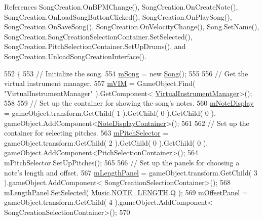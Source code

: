 References Song\+Creation.\+On\+B\+P\+M\+Change(), Song\+Creation.\+On\+Create\+Note(), Song\+Creation.\+On\+Load\+Song\+Button\+Clicked(), Song\+Creation.\+On\+Play\+Song(), Song\+Creation.\+On\+Save\+Song(), Song\+Creation.\+On\+Velocity\+Change(), Song.\+Set\+Name(), Song\+Creation.\+Song\+Creation\+Selection\+Container.\+Set\+Selected(), Song\+Creation.\+Pitch\+Selection\+Container.\+Set\+Up\+Drums(), and Song\+Creation.\+Unload\+Song\+Creation\+Interface().


\begin{DoxyCode}
552     \{
553         \textcolor{comment}{// Initialize the song.}
554         \hyperlink{group___s_c_priv_var_ga9554e9b3758d1cc1e841a5f7d8aa9f56}{mSong} = \textcolor{keyword}{new} \hyperlink{class_song}{Song}();
555 
556         \textcolor{comment}{// Get the virtual instrument manager.}
557         \hyperlink{group___s_c_priv_var_ga1bad472098eec4194c5b18e7b3ccfd94}{mVIM} = GameObject.Find( \textcolor{stringliteral}{"VirtualInstrumentManager"} ).GetComponent<
      \hyperlink{class_virtual_instrument_manager}{VirtualInstrumentManager}>();
558 
559         \textcolor{comment}{// Set up the container for showing the song's notes.}
560         \hyperlink{group___s_c_priv_var_ga19cefeb7077126193c7f60d07dfdf32c}{mNoteDisplay} = gameObject.transform.GetChild( 1 ).GetChild( 0 ).GetChild( 0 ).
      gameObject.AddComponent<\hyperlink{class_note_display_container}{NoteDisplayContainer}>();
561 
562         \textcolor{comment}{// Set up the container for selecting pitches.}
563         \hyperlink{group___s_c_priv_var_gac32e68713b2b504807f52acef445df1c}{mPitchSelector} = gameObject.transform.GetChild( 2 ).GetChild( 0 ).GetChild( 0 ).
      gameObject.AddComponent<PitchSelectionContainer>();
564         mPitchSelector.SetUpPitches();
565 
566         \textcolor{comment}{// Set up the panels for choosing a note's length and offset.}
567         \hyperlink{group___s_c_priv_var_ga370237b50bc11a581fc963cdd8ffd4ea}{mLengthPanel} = gameObject.transform.GetChild( 3 ).gameObject.AddComponent<
      SongCreationSelectionContainer>();
568         \hyperlink{group___s_c_priv_var_ga370237b50bc11a581fc963cdd8ffd4ea}{mLengthPanel}.\hyperlink{group___s_c_handlers_ga71307336af2197a0ee20bbaf3bfb02aa}{SetSelected}( \hyperlink{class_music}{Music}.\hyperlink{group___music_enums_gaf11b5f079adbb21c800b9eca1c5c3cbd}{NOTE\_LENGTH}.Q );
569         \hyperlink{group___s_c_priv_var_gafeeda8ab122f574c6fff94814234334c}{mOffsetPanel} = gameObject.transform.GetChild( 4 ).gameObject.AddComponent<
      SongCreationSelectionContainer>();
570 

\end{DoxyCode}
